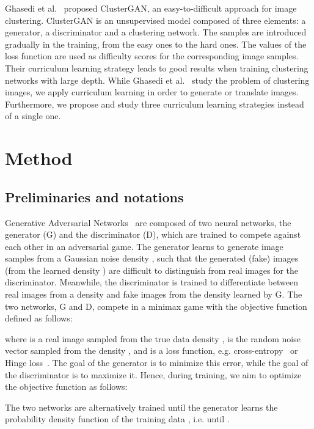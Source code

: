 \documentclass[10pt,twocolumn,letterpaper]{article}
\begin{document}
Ghasedi et al.~\cite{Ghasedi-CVPR-2019} proposed ClusterGAN, an easy-to-difficult approach for image clustering. ClusterGAN is an unsupervised model composed of three elements: a generator, a discriminator and a clustering network. The samples are introduced gradually in the training, from the easy ones to the hard ones. The values of the loss function are used as difficulty scores for the corresponding image samples. Their curriculum learning strategy leads to good results when training clustering networks with large depth. While Ghasedi et al.~\cite{Ghasedi-CVPR-2019} study the problem of clustering images, we apply curriculum learning in order to generate or translate images. Furthermore, we propose and study three curriculum learning strategies instead of a single one.

\vspace{-0.1cm}
\section{Method}
\label{sec_Method}
\vspace{-0.1cm}
\subsection{Preliminaries and notations}
\vspace{-0.1cm}

Generative Adversarial Networks~\cite{Goodfellow-NIPS-2014} are composed of two neural networks, the generator (G) and the discriminator (D), which are trained to compete against each other in an adversarial game. The generator learns to generate image samples from a Gaussian noise density , such that the generated (fake) images (from the learned density ) are difficult to distinguish from real images for the discriminator. Meanwhile, the discriminator is trained to differentiate between real images from a density  and fake images from the density  learned by G. The two networks, G and D, compete in a minimax game with the objective function  defined as follows:

where  is a real image sampled from the true data density ,  is the random noise vector sampled from the density , and  is a loss function, e.g. cross-entropy~\cite{Goodfellow-NIPS-2014} or Hinge loss~\cite{Miyato-ICLR-2018}. The goal of the generator  is to minimize this error, while the goal of the discriminator  is to maximize it. Hence, during training, we aim to optimize the objective function as follows:

The two networks are alternatively trained until the generator learns the probability density function of the training data , i.e. until .
\end{document}
